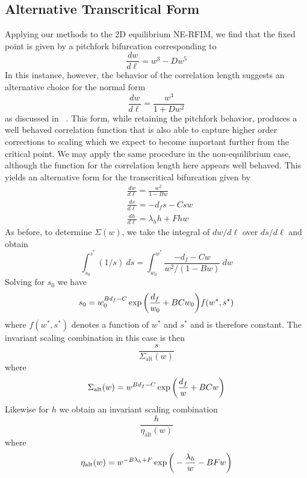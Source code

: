 \documentclass[reprint,amsmath,amssymb,aps,floatfix]{revtex4-1}
\begin{document}
\subsection{\label{app:well-behaved} Alternative Transcritical Form}
Applying our methods to the 2D equilibrium NE-RFIM, we find that the fixed point is given by a pitchfork bifurcation corresponding to
%
\begin{equation}
\frac{dw}{d\ell}= w^3-D w^5
\end{equation} 
%
In this instance, however, the behavior of the correlation length suggests an alternative choice for the normal form 
%
\begin{equation}
\frac{dw}{d\ell}= \frac{w^3}{1+D w^2}
\end{equation}
% 
as discussed in ~\cite{Raju17}. This form, while retaining the pitchfork behavior, produces a well behaved correlation function that is also able to capture higher order corrections to scaling which we expect to become important further from the critical point. We may apply the same procedure in the non-equilibrium case, although the function for the correlation length here appears well behaved. This yields an alternative form for the transcritical bifurcation given by
%
\begin{equation}
	\begin{split}
		&\frac{dw}{d\ell}= \frac{w^2}{1-B w}\\
		&\frac{ds}{d\ell}= -d_f s-C s w\\
		&\frac{dh}{d\ell}= \lambda_h h+F h w
		\end{split}
\end{equation}
%
As before, to determine $\Sigma(w)$, we take the integral of $dw/d\ell$ over $ds/d\ell$ and obtain
%
\begin{equation}
	\int_{s_0}^{s^*}(1/s)\ ds = \int_{w_0}^{w^*}\frac{-d_f-Cw}{w^2/(1- B w)}\ dw
\end{equation}
%
\noindent Solving for $s_0$ we have
%
\begin{equation}
	s_0 =w_0^{B d_f -C} \exp \bigg{(}\frac{d_f}{w_0}+B C w_0\bigg{)}f(w^*, s^*)
\end{equation} 
%
\noindent where $f(w^*, s^*)$ denotes a function of $w^*$ and $s^*$ and is therefore constant. The invariant scaling combination in this case is then
%
\begin{equation}
	\frac{s}{\Sigma_{\textrm{alt}}(w)}
\end{equation}
%
\noindent where
%
\begin{equation}
	\Sigma_{\textrm{alt}}(w) = w^{B d_f -C}\exp \bigg{(}\frac{d_f}{w}+B C w\bigg{)}
\end{equation}
%
\noindent Likewise for $h$ we obtain an invariant scaling combination
%
\begin{equation}
	\frac{h}{\eta_{\textrm{alt}}(w)}
\end{equation}
%
\noindent where
%
\begin{equation}
	\eta_{\textrm{alt}}(w) = w^{-B \lambda_h + F}\exp \bigg{(}-\frac{\lambda_h}{w}-B F w\bigg{)}
\end{equation}
%
\end{document}
